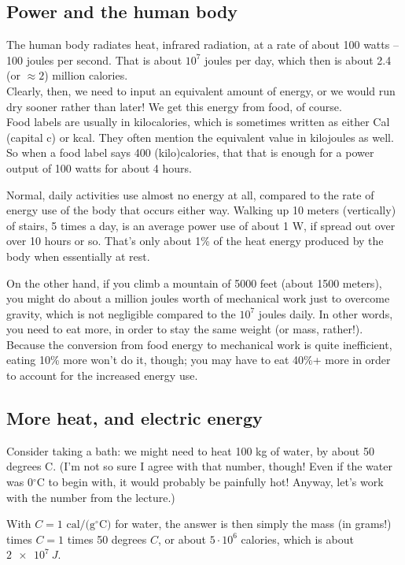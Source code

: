 \documentclass[12pt,a4paper]{report}
\begin{document}
\subsection{Power and the human body}

The human body radiates heat, infrared radiation, at a rate of about 100 watts -- 100 joules per second. That is about $10^7$ joules per day, which then is about 2.4 (or $\approx 2$) million calories.\\
Clearly, then, we need to input an equivalent amount of energy, or we would run dry sooner rather than later! We get this energy from food, of course.\\
Food labels are usually in kilocalories, which is sometimes written as either Cal (capital c) or kcal. They often mention the equivalent value in kilojoules as well.\\
So when a food label says 400 (kilo)calories, that that is enough for a power output of 100 watts for about 4 hours.

Normal, daily activities use almost no energy at all, compared to the rate of energy use of the body that occurs either way. Walking up 10 meters (vertically) of stairs, 5 times a day, is an average power use of about 1 W, if spread out over over 10 hours or so. That's only about 1\% of the heat energy produced by the body when essentially at rest.

On the other hand, if you climb a mountain of 5000 feet (about 1500 meters), you might do about a million joules worth of mechanical work just to overcome gravity, which is not negligible compared to the $10^7$ joules daily. In other words, you need to eat more, in order to stay the same weight (or mass, rather!).\\
Because the conversion from food energy to mechanical work is quite inefficient, eating 10\% more won't do it, though; you may have to eat 40\%+ more in order to account for the increased energy use.

\subsection{More heat, and electric energy}

Consider taking a bath: we might need to heat 100 kg of water, by about 50 degrees C. (I'm not so sure I agree with that number, though! Even if the water was $0 {}^\circ$C to begin with, it would probably be painfully hot! Anyway, let's work with the number from the lecture.)

With $C = 1 \text{ cal/(g} {}^\circ \text{C})$ for water, the answer is then simply the mass (in grams!) times $C = 1$ times 50 degrees $C$, or about $5 \cdot 10^6$ calories, which is about $\SI{2e7}{J}$.
\end{document}

